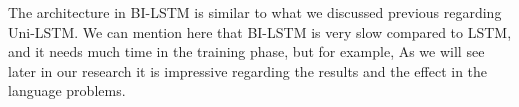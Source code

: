 The architecture in BI-LSTM is similar to what we discussed previous regarding Uni-LSTM. We can mention here that BI-LSTM is very slow compared to LSTM, and it needs much time in the training phase, but for example, As we will see later in our research it is impressive regarding the results and the effect in the language problems.



